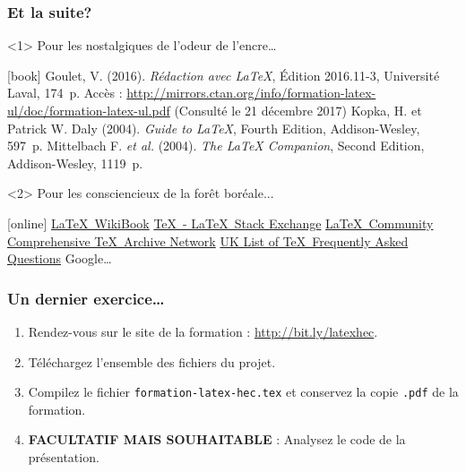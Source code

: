 \begin{frame}

	\frametitle{Et la suite?}
	
	\begin{onlyenv}
		Pour les nostalgiques de l'odeur de l'encre\dots
		
		\begin{thebibliography}{99}
			[book]
			 Goulet, V. (2016). \textit{Rédaction avec {\LaTeX}}, Édition 2016.11-3, Université Laval, 174~p. Accès : \href{http://mirrors.ctan.org/info/formation-latex-ul/doc/formation-latex-ul.pdf}{%
				http://mirrors.ctan.org/info/formation-latex-ul/doc/formation-latex-ul.pdf} (Consulté le 21 décembre 2017)
			 Kopka, H. et Patrick W. Daly (2004). \textit{Guide to {\LaTeX}}, Fourth Edition, Addison-Wesley, 597~p.
			 Mittelbach F. \textit{et al.} (2004). \textit{The {\LaTeX} Companion}, Second Edition, Addison-Wesley, 1119~p.
		\end{thebibliography}
	\end{onlyenv}

	\begin{onlyenv}
		Pour les consciencieux de la forêt boréale...
		
		\begin{thebibliography}{99}
			 \href{https://en.wikibooks.org/wiki/LaTeX}{\LaTeX\ WikiBook}
			 \href{https://tex.stackexchange.com/}{\TeX\ - \LaTeX\ Stack Exchange}
			 \href{http://latex.org/forum/}{\LaTeX\ Community}
			 \href{https://ctan.org/}{Comprehensive \TeX\ Archive Network}
			 \href{http://www.tex.ac.uk/}{UK List of \TeX\ Frequently Asked Questions}
			 Google\dots
		\end{thebibliography}
	\end{onlyenv}
\end{frame}


\begin{frame}[c]

	\frametitle{Un dernier exercice\dots}
	
	\begin{enumerate}
		\item Rendez-vous sur le site de la formation : \href{http://bit.ly/latexhec}{http://bit.ly/latexhec}.
		\item Téléchargez l'ensemble des fichiers du projet.
		\item Compilez le fichier \texttt{formation-latex-hec.tex} et conservez la copie \texttt{.pdf} de la formation.
		\item \textbf{FACULTATIF MAIS SOUHAITABLE} : Analysez le code de la présentation.
	\end{enumerate}
\end{frame}